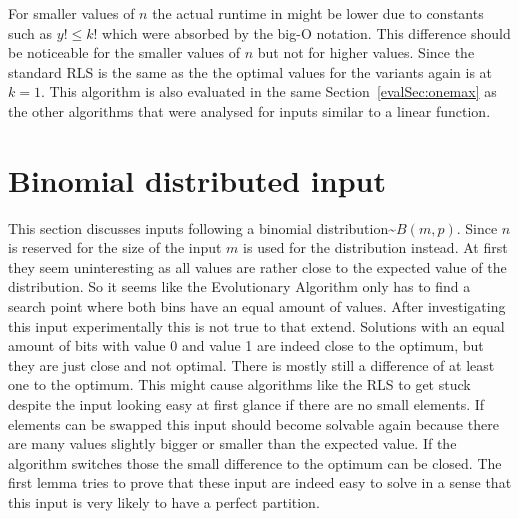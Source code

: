 For smaller values of $n$ the actual runtime in might be lower due to constants such as $y!\le k!$ which were absorbed by the big-O notation.
This difference should be noticeable for the smaller values of $n$ but not for higher values.
Since the standard RLS is the same as the \RLSN[1] the optimal values for the \RLSN[k] variants again is at $k=1$.
This algorithm is also evaluated in the same Section~\ref{evalSec:onemax} as the other algorithms that were analysed for inputs similar to a linear function.

\section{Binomial distributed input}
This section discusses inputs following a binomial distribution\textasciitilde$B(m,p)$.
Since $n$ is reserved for the size of the input $m$ is used for the distribution instead.
At first they seem uninteresting as all values are rather close to the expected value of the distribution.
So it seems like the Evolutionary Algorithm only has to find a search point where both bins have an equal amount of values.
After investigating this input experimentally this is not true to that extend.
Solutions with an equal amount of bits with value 0 and value 1 are indeed close to the optimum, but they are just close and not optimal.
There is mostly still a difference of at least one to the optimum.
This might cause algorithms like the RLS to get stuck despite the input looking easy at first glance if there are no small elements.
If elements can be swapped this input should become solvable again because there are many values slightly bigger or smaller than the expected value.
If the algorithm switches those the small difference to the optimum can be closed.
The first lemma tries to prove that these input are indeed easy to solve in a sense that this input is very likely to have a perfect partition.

